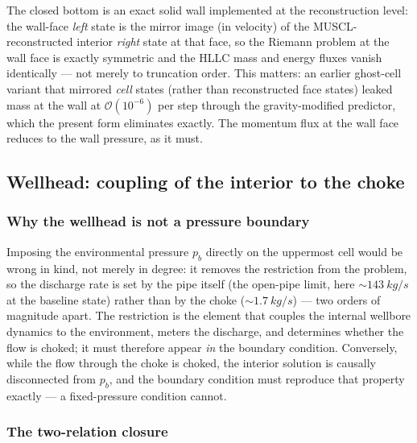 \documentclass[11pt]{article}
\begin{document}
The closed bottom is an exact solid wall implemented at the
reconstruction level: the wall-face \emph{left} state is the mirror
image (in velocity) of the MUSCL-reconstructed interior \emph{right}
state at that face, so the Riemann problem at the wall face is exactly
symmetric and the HLLC mass and energy fluxes vanish identically ---
not merely to truncation order. This matters: an earlier ghost-cell
variant that mirrored \emph{cell} states (rather than reconstructed
face states) leaked mass at the wall at $\mathcal{O}(10^{-6})$ per
step through the gravity-modified predictor, which the present form
eliminates exactly. The momentum flux at the wall face reduces to the
wall pressure, as it must.

\subsection{Wellhead: coupling of the interior to the choke}
\label{sec:choke}

\subsubsection{Why the wellhead is not a pressure boundary}

Imposing the environmental pressure $p_b$ directly on the uppermost
cell would be wrong in kind, not merely in degree: it removes the
restriction from the problem, so the discharge rate is set by the pipe
itself (the open-pipe limit, here ${\sim}\SI{143}{kg/s}$ at the
baseline state) rather than by the choke
(${\sim}\SI{1.7}{kg/s}$) --- two orders of magnitude apart. The
restriction is the element that couples the internal wellbore dynamics
to the environment, meters the discharge, and determines whether the
flow is choked; it must therefore appear \emph{in} the boundary
condition. Conversely, while the flow through the choke is choked, the
interior solution is causally disconnected from $p_b$, and the
boundary condition must reproduce that property exactly --- a
fixed-pressure condition cannot.

\subsubsection{The two-relation closure}
\end{document}
